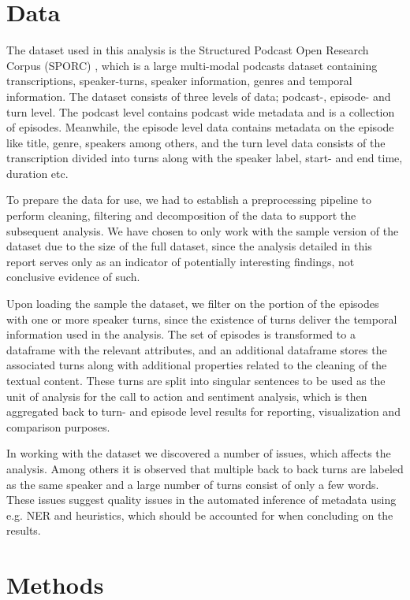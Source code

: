 \documentclass{article}
\begin{document}
\section{Data}
The dataset used in this analysis is the Structured Podcast Open Research Corpus (SPORC) \cite{blitt2025_sporc}, which is a large multi-modal podcasts dataset containing transcriptions, speaker-turns, speaker information, genres and temporal information. The dataset consists of three levels of data; podcast-, episode- and turn level. The podcast level contains podcast wide metadata and is a collection of episodes. Meanwhile, the episode level data contains metadata on the episode like title, genre, speakers among others, and the turn level data consists of the transcription divided into turns along with the speaker label, start- and end time, duration etc.

To prepare the data for use, we had to establish a preprocessing pipeline to perform cleaning, filtering and decomposition of the data to support the subsequent analysis. We have chosen to only work with the sample version of the dataset due to the size of the full dataset, since the analysis detailed in this report serves only as an indicator of potentially interesting findings, not conclusive evidence of such.

Upon loading the sample the dataset, we filter on the portion of the episodes with one or more speaker turns, since the existence of turns deliver the temporal information used in the analysis. The set of episodes is transformed to a dataframe with the relevant attributes, and an additional dataframe stores the associated turns along with additional properties related to the cleaning of the textual content. These turns are split into singular sentences to be used as the unit of analysis for the call to action and sentiment analysis, which is then aggregated back to turn- and episode level results for reporting, visualization and comparison purposes.

In working with the dataset we discovered a number of issues, which affects the analysis. Among others it is observed that multiple back to back turns are labeled as the same speaker and a large number of turns consist of only a few words. These issues suggest quality issues in the automated inference of metadata using e.g. NER and heuristics, which should be accounted for when concluding on the results.

\section{Methods}
\end{document}
